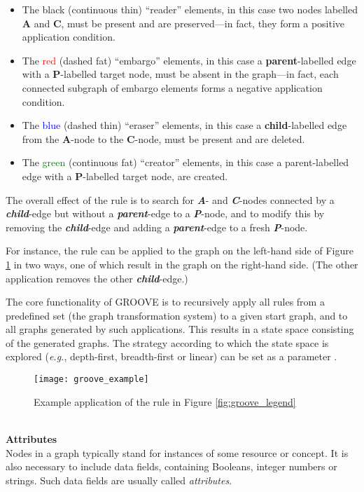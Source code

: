 \begin{itemize}
\item The black (continuous thin) \enquote{reader} elements, in this case two nodes labelled \textbf{A} and \textbf{C}, must be present and are preserved—in fact, they form a positive application condition.
\item The \textcolor{red}{red} (dashed fat) \enquote{embargo} elements, in this case a \textbf{parent}-labelled edge with a \textbf{P}-labelled target node, must be absent in the graph—in fact, each connected subgraph of embargo elements forms a negative application condition.
\item The \textcolor{blue}{blue} (dashed thin) \enquote{eraser} elements, in this case a \textbf{child}-labelled edge from the \textbf{A}-node to the \textbf{C}-node, must be present and are deleted.
\item The \textcolor{green}{green} (continuous fat) \enquote{creator} elements, in this case a parent-labelled edge with a \textbf{P}-labelled target node, are created.
\end{itemize}
The overall effect of the rule is to search for \emph{\textbf{A}}- and \emph{\textbf{C}}-nodes connected by a \emph{\textbf{child}}-edge but without a \emph{\textbf{parent}}-edge to a \emph{\textbf{P}}-node, and to modify this by removing the \emph{\textbf{child}}-edge and adding a \emph{\textbf{parent}}-edge to a fresh \emph{\textbf{P}}-node.

 For instance, the rule can be applied to the graph on the left-hand side of Figure \ref{fig:groove_example}  in two ways, one of which result in the graph on the right-hand side. (The other application removes the other \emph{\textbf{child}}-edge.)

The core functionality of GROOVE is to recursively apply all rules from a predefined set (the graph transformation system) to a given start graph, and to all graphs generated by such applications. This results in a state space consisting of the generated graphs. The strategy according to which the state space is explored (\emph{e.g.}, depth-first, breadth-first or linear) can be set as a parameter \cite{ghamarian2012modelling}.
\begin{figure}
\center
\texttt{[image: groove\_example]}
\caption{Example application of the rule in Figure \ref{fig:groove_legend}}\label{fig:groove_example}
\end{figure}\\ 
\textbf{Attributes}\\ 
Nodes in a graph typically stand for instances of some resource or concept. It is also necessary to include data fields, containing Booleans, integer numbers or strings. Such data fields are usually called \emph{attributes}. 

